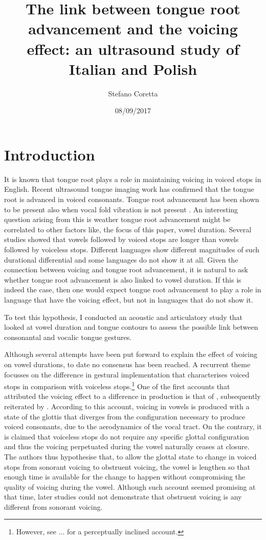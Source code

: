 \documentclass[]{elsarticle}
\title{The link between tongue root advancement and the voicing effect: an
ultrasound study of Italian and Polish}
\author{Stefano Coretta}
\date{08/09/2017}
\begin{document}
\maketitle

\section{Introduction}\label{introduction}

It is known that tongue root plays a role in maintaining voicing in
voiced stops in English. Recent ultrasound tongue imaging work has
confirmed that the tongue root is advanced in voiced consonants. Tongue
root advancement has been shown to be present also when vocal fold
vibration is not present \citep{ahn2016}. An interesting question
arising from this is weather tongue root advancement might be correlated
to other factors like, the focus of this paper, vowel duration. Several
studies showed that vowels followed by voiced stops are longer than
vowels followed by voiceless stops. Different languages show different
magnitudes of such durational differential and some languages do not
show it at all. Given the connection between voicing and tongue root
advancement, it is natural to ask whether tongue root advancement is
also linked to vowel duration. If this is indeed the case, then one
would expect tongue root advancement to play a role in language that
have the voicing effect, but not in languages that do not show it.

To test this hypothesis, I conducted an acoustic and articulatory study
that looked at vowel duration and tongue contours to assess the possible
link between consonantal and vocalic tongue gestures.

Although several attempts have been put forward to explain the effect of
voicing on vowel durations, to date no consensus has been reached. A
recurrent theme focusses on the difference in gestural implementation
that characterises voiced stops in comparison with voiceless
stops.\footnote{However, see ... for a perceptually inclined account.}
One of the first accounts that attributed the voicing effect to a
difference in production is that of \citet{halle1967}, subsequently
reiterated by \citet{chomsky1968}. According to this account, voicing in
vowels is produced with a state of the glottis that diverges from the
configuration necessary to produce voiced consonants, due to the
aerodynamics of the vocal tract. On the contrary, it is claimed that
voiceless stops do not require any specific glottal configuration and
thus the voicing perpetuated during the vowel naturally ceases at
closure. The authors thus hypothesise that, to allow the glottal state
to change in voiced stops from sonorant voicing to obstruent voicing,
the vowel is lengthen so that enough time is available for the change to
happen without compromising the quality of voicing during the vowel.
Although such account seemed promising at that time, later studies could
not demonstrate that obstruent voicing is any different from sonorant
voicing.
\end{document}
